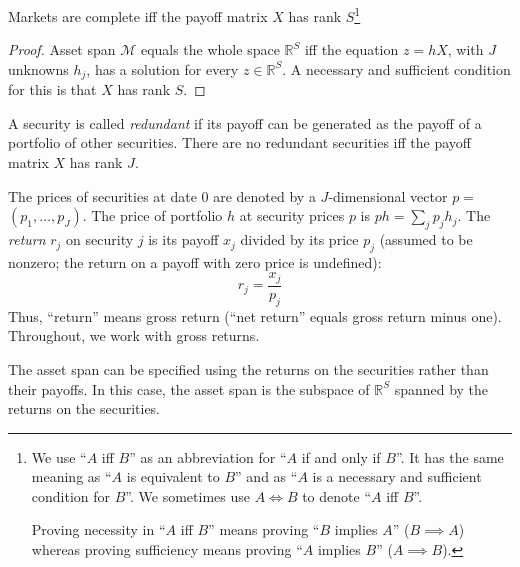 \documentclass[\topdir/lecture\_notes.tex]{subfiles}
\begin{document}
\begin{theorem}\label{thm:market_completeness}
Markets are complete iff the payoff matrix \(X\) has rank \(S\)\footnote{We use ``\(A\) iff \(B\)'' as an abbreviation for ``\(A\) if and only if \(B\)''. It has the same meaning as ``\(A\) is equivalent to \(B\)'' and as ``\(A\) is a necessary and sufficient condition for \(B\)''. We sometimes use \(A \iff B\) to denote ``\(A\) iff \(B\)''.

Proving necessity in ``\(A\) iff \(B\)'' means proving ``\(B\) implies \(A\)'' (\(B \implies A\)) whereas proving sufficiency means proving ``\(A\) implies \(B\)'' (\(A \implies B\)).
}
\end{theorem}
\begin{proof}
Asset span \(\mathcal{M}\) equals the whole space \(\mathbb{R}^{S}\) iff the equation \(z=h X\), with \(J\) unknowns \(h_{j}\), has a solution for every \(z \in \mathbb{R}^{S}\). A necessary and sufficient condition for this is that \(X\) has rank \(S\).
\end{proof}

A security is called \emph{redundant} if its payoff can be generated as the payoff of a portfolio of other securities. There are no redundant securities iff the payoff matrix \(X\) has rank \(J\).

The prices of securities at date \(0\) are denoted by a \(J\)-dimensional vector \(p=\) \(\left(p_{1}, \ldots, p_{J}\right)\). The price of portfolio \(h\) at security prices \(p\) is \(p h=\sum_{j} p_{j} h_{j}\). The \emph{return} \(r_{j}\) on security \(j\) is its payoff \(x_{j}\) divided by its price \(p_{j}\) (assumed to be nonzero; the return on a payoff with zero price is undefined):
\begin{equation*}
r_{j}=\frac{x_{j}}{p_{j}} 
\end{equation*}
Thus, ``return'' means gross return (``net return'' equals gross return minus one). Throughout, we work with gross returns.

The asset span can be specified using the returns on the securities rather than their payoffs. In this case, the asset span is the subspace of \(\mathbb{R}^{S}\) spanned by the returns on the securities.
\end{document}
